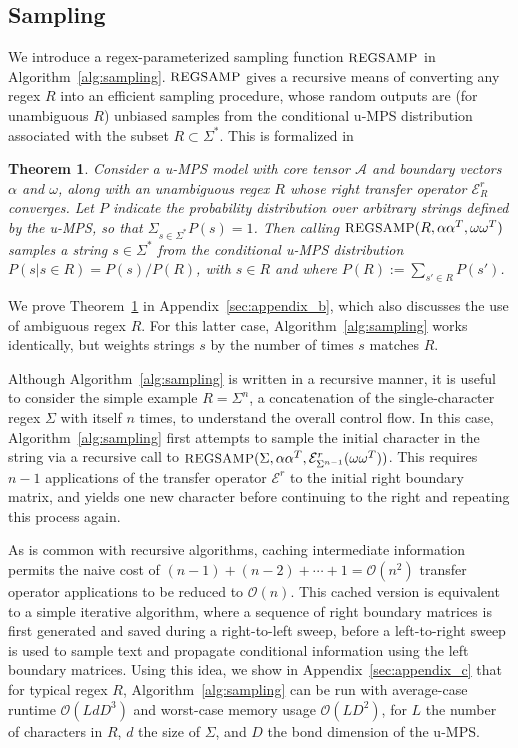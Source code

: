 \documentclass[twoside]{article}
\newtheorem{theorem}{Theorem}
\newcommand{\Sample}{\textsc{\small REGSAMP}}
\newcommand{\bigO}{\mc{O}}
\newcommand{\ER}{\mc{E}^{\scriptstyle r}}
\newcommand{\alphamat}{\alpha\alpha^T}
\newcommand{\omegamat}{\omega\omega^T}
\newcommand{\mc}[1]{\mathcal{#1}}
\begin{document}
\subsection{Sampling}

We introduce a regex-parameterized sampling function $\Sample$ in Algorithm~\ref{alg:sampling}. $\Sample$ gives a recursive means of converting any regex $R$ into an efficient sampling procedure, whose random outputs are (for unambiguous $R$) unbiased samples from the conditional u-MPS distribution associated with the subset $R \subset \Sigma^*$. This is formalized in
%
\begin{theorem}
\label{thm:sample}
Consider a u-MPS model with core tensor $\mc{A}$ and boundary vectors $\alpha$ and $\omega$, along with an unambiguous regex $R$ whose right transfer operator $\ER_R$ converges. Let $P$ indicate the probability distribution over arbitrary strings defined by the u-MPS, so that $\Sigma_{s\in\Sigma^*} P(s) = 1$. Then calling $\Sample(R, \alphamat, \omegamat)$ samples a string $s \in \Sigma^*$ from the conditional u-MPS distribution $P(s | s \in R) = P(s) / P(R)$, with $s \in R$ and where $P(R) := \sum_{s' \in R} P(s')$.
\end{theorem}
%
We prove Theorem~\ref{thm:sample} in Appendix~\ref{sec:appendix_b}, which also discusses the use of ambiguous regex $R$. For this latter case, Algorithm~\ref{alg:sampling} works identically, but weights strings $s$ by the number of times $s$ matches $R$.

Although Algorithm~\ref{alg:sampling} is written in a recursive manner, it is useful to consider the simple example $R = \Sigma^n$, a concatenation of the single-character regex $\Sigma$ with itself $n$ times, to understand the overall control flow. In this case, Algorithm~\ref{alg:sampling} first attempts to sample the initial character in the string via a recursive call to $\Sample(\Sigma, \alphamat, \ER_{\Sigma^{n-1}}(\omegamat))$. This requires $n-1$ applications of the transfer operator $\ER$ to the initial right boundary matrix, and yields one new character before continuing to the right and repeating this process again.

As is common with recursive algorithms, caching intermediate information permits the naive cost of $(n-1) + (n-2) + \cdots + 1 = \bigO(n^2)$ transfer operator applications to be reduced to $\bigO(n)$. This cached version is equivalent to a simple iterative algorithm, where a sequence of right boundary matrices is first generated and saved during a right-to-left sweep, before a left-to-right sweep is used to sample text and propagate conditional information using the left boundary matrices. Using this idea, we show in Appendix~\ref{sec:appendix_c} that for typical regex $R$, Algorithm~\ref{alg:sampling} can be run with average-case runtime $\bigO(L d D^3)$ and worst-case memory usage $\bigO(L D^2)$, for $L$ the number of characters in $R$, $d$ the size of $\Sigma$, and $D$ the bond dimension of the u-MPS.
\end{document}
